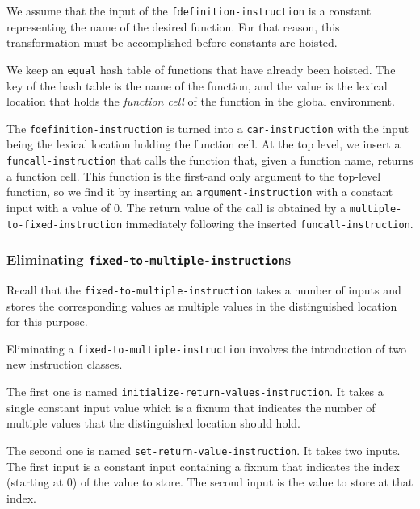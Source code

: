 We assume that the input of the \texttt{fdefinition-instruction} is a
constant representing the name of the desired function.  For that
reason, this transformation must be accomplished before constants are
hoisted.

We keep an \texttt{equal} hash table of functions that have already
been hoisted.  The key of the hash table is the name of the function,
and the value is the lexical location that holds the \emph{function
  cell} of the function in the global environment.

The \texttt{fdefinition-instruction} is turned into a
\texttt{car-instruction} with the input being the lexical location
holding the function cell.  At the top level, we insert a
\texttt{funcall-instruction} that calls the function that, given a
function name, returns a function cell.  This function is the
first-and only argument to the top-level function, so we find it by
inserting an \texttt{argument-instruction} with a constant input with
a value of $0$.  The return value of the call is obtained by a
\texttt{multiple-to-fixed-instruction} immediately following the
inserted \texttt{funcall-instruction}.%

\subsubsection{Eliminating \texttt{fixed-to-multiple-instruction}s}

Recall that the \texttt{fixed-to-multiple-instruction} takes a
number of inputs and stores the corresponding values as multiple
values in the distinguished location for this purpose.

Eliminating a \texttt{fixed-to-multiple-instruction} involves the
introduction of two new instruction classes.

The first one is named \texttt{initialize-return-values-instruction}.
It takes a single constant input value which is a fixnum that
indicates the number of multiple values that the distinguished
location should hold.

The second one is named \texttt{set-return-value-instruction}.  It
takes two inputs.  The first input is a constant input containing a
fixnum that indicates the index (starting at 0) of the value to
store.  The second input is the value to store at that index.

